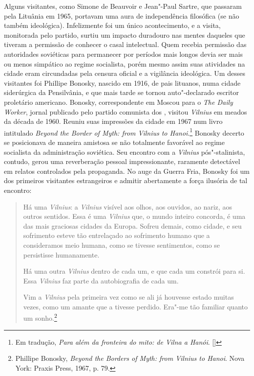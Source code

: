 Alguns visitantes, como Simone de Beauvoir e Jean"-Paul Sartre, que passaram
pela Lituânia em 1965, portavam uma aura de independência filosófica (se
não também ideológica). Infelizmente foi um único acontecimento, e a
visita, monitorada pelo partido, surtiu um impacto duradouro nas mentes
daqueles que tiveram a permissão de conhecer o casal intelectual. Quem
recebia permissão das autoridades soviéticas para permanecer por
períodos mais longos devia ser mais ou menos simpático ao regime
socialista, porém mesmo assim suas atividades na cidade eram circundadas
pela censura oficial e a vigilância ideológica. Um desses visitantes foi
Phillipe Bonosky, nascido em 1916, de pais lituanos, numa cidade
siderúrgica da Pensilvânia, e que mais tarde se tornou auto"-declarado
escritor proletário americano. Bonosky, correspondente em Moscou para o
\textit{The Daily Worker}, jornal publicado pelo partido comunista dos
, visitou \textit{Vilnius} em meados da década de 1960. Reuniu suas impressões
da cidade em 1967 num livro intitulado \textit{Beyond the Border of Myth:
from \textit{Vilnius} to Hanoi}.\footnote{Em tradução, \textit{Para além da fronteira do mito: de Vilna a Hanói}. []} Bonosky decerto se posicionava de maneira amistosa se não totalmente favorável ao regime socialista da administração
soviética. Seu encontro com a \textit{Vilnius} pós"-stalinista, contudo, gerou uma
reverberação pessoal impressionante, raramente detectável em relatos
controlados pela propaganda. No auge da Guerra Fria, Bonosky foi um dos
primeiros visitantes estrangeiros e admitir abertamente a força ilusória
de tal encontro:

\begin{quote}
Há uma \textit{Vilnius}: a \textit{Vilnius} visível aos olhos, aos ouvidos, ao nariz, aos
outros sentidos. Essa é uma \textit{Vilnius} que, o mundo inteiro concorda, é uma
das mais graciosas cidades da Europa. Sofreu demais, como cidade, e seu
sofrimento esteve tão entrelaçado ao sofrimento humano que a
consideramos meio humana, como se tivesse sentimentos, como se
persistisse humanamente.

Há uma outra \textit{Vilnius} dentro de cada um, e que cada um constrói para si.
Essa \textit{Vilnius} faz parte da autobiografia de cada um.

Vim a \textit{Vilnius} pela primeira vez como se ali já houvesse estado muitas
vezes, como um amante que a tivesse perdido. Era"-me tão familiar quanto
um sonho.\footnote{Phillipe Bonosky, \textit{Beyond the Borders of Myth: from \textit{Vilnius} to Hanoi}. Nova York: Praxis Press, 1967, p. 79.} \end{quote}

